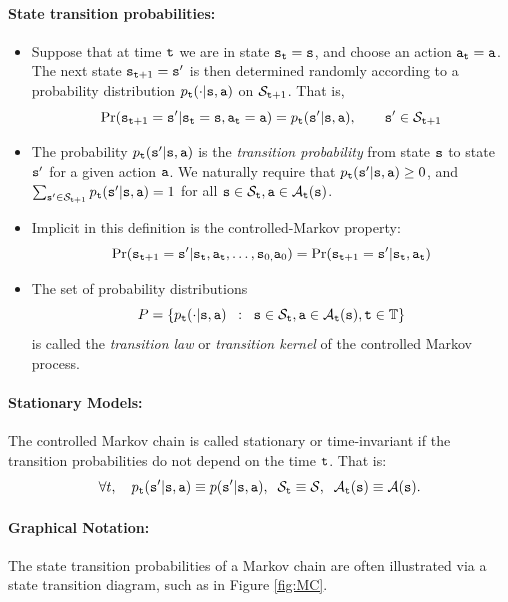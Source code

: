 \paragraph{State transition probabilities:}
\begin{itemize}
\item   Suppose that at time ${\tt t}$ we are in state ${{\tt s}_{\tt t}} = {\tt s}$, and choose an action ${{\tt a}_{\tt t}} = {\tt a}$. The next state ${{\tt s}_{{\tt t} + 1}} = {\tt s}'$ is then determined randomly according to a probability distribution  ${p_{\tt t}}( \cdot |{\tt s},{\tt a})$ on ${\mathcal{S}_{{\tt t} + 1}}$. That is,
\[\Pr({{\tt s}_{{\tt t} + 1}} = {\tt s}'|{{\tt s}_{\tt t}} = {\tt s},{{\tt a}_{\tt t}} = {\tt a}) = {p_{\tt t}}({\tt s}'|{\tt s},{\tt a}),\quad      \quad {\tt s}' \in {\mathcal{S}_{{\tt t}+ 1}}\]
\item   The probability ${p_{\tt t}}({\tt s}'|{\tt s},{\tt a})$ is the \emph{transition probability} from state ${\tt s}$ to state ${\tt s}'$ for a given action ${\tt a}$. We naturally require that
            ${p_{\tt t}}({\tt s}'|{\tt s},{\tt a}) \ge 0$, and $\sum\nolimits_{{\tt s}' \in {\mathcal{S}_{{\tt t}+ 1}}}^{} {{p_{\tt t}}({\tt s}'|{\tt s},{\tt a})}  = 1$ for all ${\tt s} \in {\mathcal{S}_{\tt t}},{\tt a} \in {\mathcal{A}_{\tt t}}({\tt s})$.
\item   Implicit in this definition is the controlled-Markov property:
\[
\Pr({{\tt s}_{{\tt t} + 1}} =
{\tt s}'|{{\tt s}_{\tt t}},{{\tt a}_{\tt t}}, \ldots
,{{\tt s}_{0,}}{{\tt a}_0}) =\Pr({{\tt s}_{{\tt t} + 1}} =
{\tt s}'|{{\tt s}_{\tt t}},{{\tt a}_{\tt t}})
\]
\item   The set of probability distributions
                                \[P = \{ {p_{\tt t}}( \cdot |{\tt s},{\tt a})\;\;:\;\;{\tt s} \in {\mathcal{S}_{\tt t}},{\tt a} \in {\mathcal{A}_{\tt t}}({\tt s}),{\tt t} \in {\ensuremath{\mathbb{T}}}\} \]
is called the \emph{transition law} or \emph{transition kernel} of the controlled Markov process.
\end{itemize}

\paragraph{Stationary Models:}
    The controlled Markov chain is called stationary or time-invariant if the transition probabilities do not depend on the time ${\tt t}$. That is:
                     \[\forall t,\quad {p_{\tt t}}({\tt s}'|{\tt s},{\tt a}) \equiv p({\tt s}'|{\tt s},{\tt a}),\;\;{\mathcal{S}_{\tt t}} \equiv \mathcal{S},\;\;{\mathcal{A}_{\tt t}}({\tt s}) \equiv \mathcal{A}({\tt s}).\]

\paragraph{Graphical Notation:}
The state transition probabilities of a Markov chain are often illustrated via a state transition diagram, such as in Figure \ref{fig:MC}.

